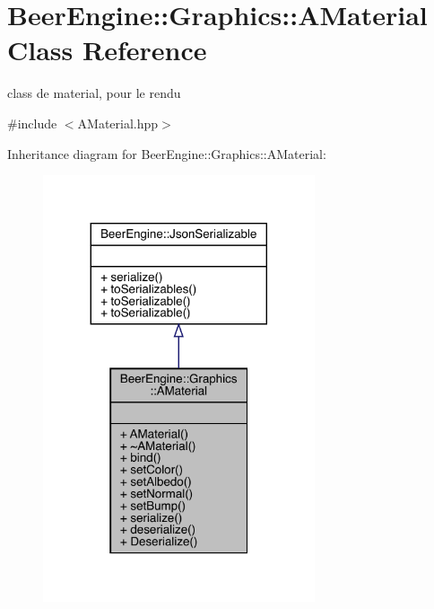 \hypertarget{class_beer_engine_1_1_graphics_1_1_a_material}{}\section{Beer\+Engine\+:\+:Graphics\+:\+:A\+Material Class Reference}
\label{class_beer_engine_1_1_graphics_1_1_a_material}


class de material, pour le rendu  




{\ttfamily \#include $<$A\+Material.\+hpp$>$}



Inheritance diagram for Beer\+Engine\+:\+:Graphics\+:\+:A\+Material\+:\nopagebreak
\begin{figure}[H]
\begin{center}
\leavevmode
\includegraphics[width=227pt]{class_beer_engine_1_1_graphics_1_1_a_material__inherit__graph}
\end{center}
\end{figure}


